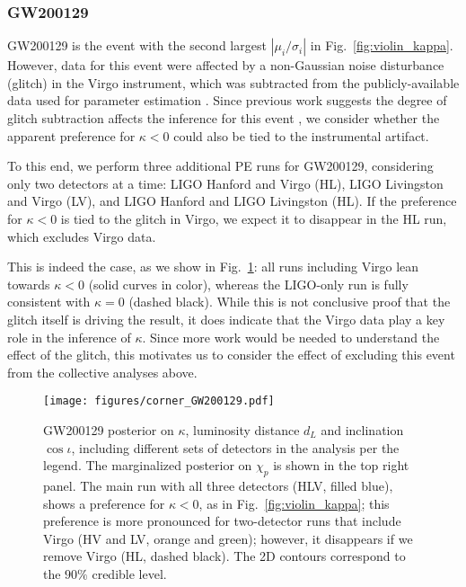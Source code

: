 \documentclass[aps,prd,twocolumn,superscriptaddress,preprintnumbers,floatfix,nofootinbib]{revtex4-2}
\begin{document}
\subsubsection{GW200129}
\label{sec:GW200129}

GW200129 is the event with the second largest $|\mu_i/\sigma_i|$ in Fig.~\ref{fig:violin_kappa}.
However, data for this event were affected by a non-Gaussian noise disturbance (glitch) in the Virgo instrument, which was subtracted from the publicly-available data used for parameter estimation \cite{Davis:2022ird}.
Since previous work suggests the degree of glitch subtraction affects the inference for this event \citep{GW200129_glitch}, we consider whether the apparent preference for $\kappa < 0$ could also be tied to the instrumental artifact.

To this end, we perform three additional \ac{PE} runs for GW200129, considering only two detectors at a time: LIGO Hanford and Virgo (HL), LIGO Livingston and Virgo (LV), and LIGO Hanford and LIGO Livingston (HL).
If the preference for $\kappa < 0$ is tied to the glitch in Virgo, we expect it to disappear in the HL run, which excludes Virgo data.

This is indeed the case, as we show in Fig.~\ref{fig:corner_GW200129}: all runs including Virgo lean towards $\kappa < 0$ (solid curves in color), whereas the LIGO-only run is fully consistent with $\kappa = 0$ (dashed black).
While this is not conclusive proof that the glitch itself is driving the result, it does indicate that the Virgo data play a key role in the inference of $\kappa$.
Since more work would be needed to understand the effect of the glitch, this motivates us to consider the effect of excluding this event from the collective analyses above.

\begin{figure}
    \texttt{[image: figures/corner\_GW200129.pdf]}
    \caption{
        GW200129 posterior on $\kappa$, luminosity distance $d_L$ and inclination $\cos{\iota}$, including different sets of detectors in the analysis per the legend.
        The marginalized posterior on $\chi_p$ is shown in the top right panel.
        The main run with all three detectors (HLV, filled blue), shows a preference for $\kappa < 0$, as in Fig.~\ref{fig:violin_kappa}; this preference is more pronounced for two-detector runs that include Virgo (HV and LV, orange and green); however, it disappears if we remove Virgo (HL, dashed black).
        The 2D contours correspond to the $90\%$ credible level.
    }
    \label{fig:corner_GW200129}
\end{figure}
\end{document}
